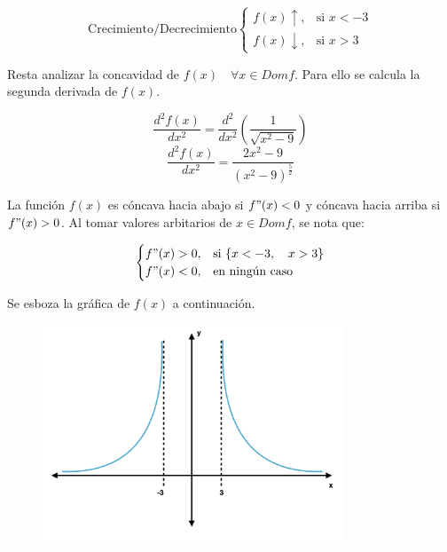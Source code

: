 \documentclass{article}
\begin{document}
\begin{enumerate}
\begin{enumerate}
                    \begin{equation*}
                        \text{Crecimiento/Decrecimiento}\begin{cases}
                            \text{$f(x) \uparrow$},   & \text{si $x<-3$} \\
                            \text{$f(x) \downarrow$}, & \text{si $x>3$}
                        \end{cases}
                    \end{equation*}

                    Resta analizar la concavidad de $f(x) \quad \forall x \in Domf$. Para ello se calcula la segunda derivada de $f(x)$.

                    $$\frac{d^2f(x)}{dx^2} = \frac{d^2}{dx^2} \left(\frac{1}{\sqrt{x^2-9}} \right)$$
                    $$\frac{d^2f(x)}{dx^2} = \frac{2x^2 - 9}{(x^2 -9)^{\frac{5}{2}}}$$

                    La función $f(x)$ es cóncava hacia abajo si $f"(x) < 0$ y cóncava hacia arriba si $f"(x) > 0$. Al tomar valores arbitarios de $x \in Domf$, se nota que:

                    \begin{equation*}
                        \begin{cases}
                            \text{$f"(x)>0$},   & \text{si \{$x<-3, \quad x>3\}$} \\
                            \text{$f"(x) < 0$}, & \text{en ningún caso}
                        \end{cases}
                    \end{equation*}

                    Se esboza la gráfica de $f(x)$ a continuación.

                    \begin{figure}[H]
                        \centering
                        \includegraphics[width=9cm]{ChartIO}
                    \end{figure}


\end{enumerate}
\end{enumerate}
\end{document}
